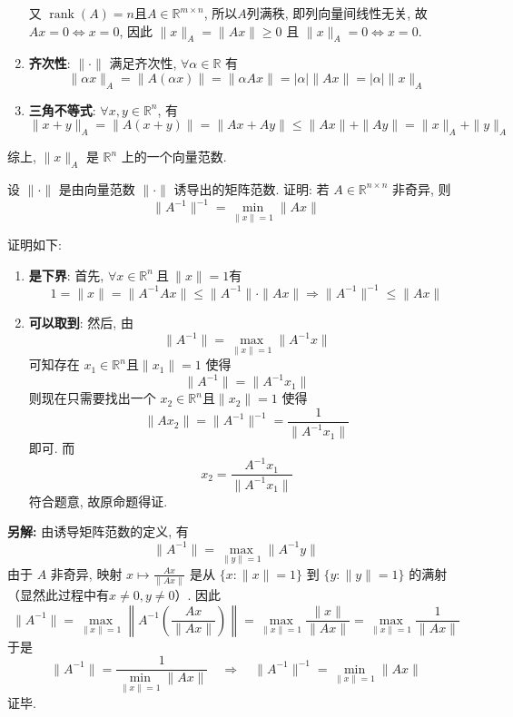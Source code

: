 \documentclass[12pt, answers]{exam}     %
\newcommand{\anothersolution}{\par\noindent\textbf{另解:}}
\newcommand{\R}{\mathbb{R}}
\begin{document}
\begin{questions}
\begin{solution}
\begin{enumerate}
    又 $\operatorname{rank}(A) = n \text{且} A \in \R^{m \times n}$, 所以$A$列满秩, 即列向量间线性无关, 
    故 $A x = 0 \Longleftrightarrow x = 0$, 因此 $\|x\|_A = \|A x\| \geq 0$ 且 $\|x\|_A = 0 \Longleftrightarrow x = 0$. 

    \item \textbf{齐次性}: $\|\cdot\|$ 满足齐次性, $\forall \alpha \in \R$ 有
    \[
    \|\alpha x\|_A = \|A (\alpha x)\| = \|\alpha A x\| = |\alpha| \|A x\| = |\alpha| \|x\|_A
    \]

    \item \textbf{三角不等式}: $\forall x, y \in \R^n$, 有
    \[
    \|x + y\|_A = \|A(x + y)\| = \|A x + A y\| \leq \|A x\| + \|A y\| = \|x\|_A + \|y\|_A
    \]
\end{enumerate}
综上, $\|x\|_A$ 是 $\R^n$ 上的一个向量范数. 
\end{solution}

\question{}
设 $\|\cdot\|$ 是由向量范数 $\|\cdot\|$ 诱导出的矩阵范数. 证明: 若 $A \in \R^{n \times n}$ 非奇异, 则
\[
\|A^{-1}\|^{-1} = \min_{\|x\|=1} \|Ax\|
\]

\begin{solution}
证明如下:
\begin{enumerate}
    \item \textbf{是下界}: 首先, $\forall x \in \R^n \ \text{且}\ \|x\| = 1$有 \[ 1 = \|x\| = \|A^{-1} A x\| \leq \|A^{-1} \| \cdot \|Ax\| \Rightarrow \|A^{-1}\|^{-1} \leq \|Ax\| \]
    \item \textbf{可以取到}: 然后, 由 \[ \|A^{-1}\| = \max_{\|x\|=1} \|A^{-1} x\| \] 可知存在 $ x_1 \in \R^n \text{且} \|x_1\| = 1 $ 使得 \[ \|A^{-1}\| = \|A^{-1} x_1\| \]
    则现在只需要找出一个 $x_2 \in \R^n \text{且} \|x_2\| = 1$ 使得 \[ \|Ax_2\| = \|A^{-1}\|^{-1} = \frac{1}{\|A^{-1} x_1\|} \] 即可.
    而 \[ x_2 = \frac{A^{-1} x_1}{\|A^{-1} x_1\|} \] 符合题意, 故原命题得证.
    \end{enumerate}
\anothersolution{}
由诱导矩阵范数的定义, 有 
\[
\| A^{-1} \| = \max_{\| y \| = 1} \| A^{-1} y \|
\]
由于 \( A \) 非奇异, 映射 \( x \mapsto \frac{A x}{\| A x \|} \) 是从 \(\{x: \|x\|=1\}\) 到 \(\{y: \|y\|=1\}\) 的满射（显然此过程中有$x \neq 0, y \neq 0$）. 因此
\[
\| A^{-1} \| = \max_{\| x \| = 1} \left\| A^{-1} \left( \frac{A x}{\| A x \|} \right) \right\| = \max_{\| x \| = 1} \frac{\| x \|}{\| A x \|} = \max_{\| x \| = 1} \frac{1}{\| A x \|}
\]
于是
\[
\| A^{-1} \| = \frac{1}{\min_{\| x \| = 1} \| A x \|}
\quad \Rightarrow \quad
\| A^{-1} \|^{-1} = \min_{\| x \| = 1} \| A x \|
\]
证毕. 
\end{solution}


\end{questions}
\end{document}
